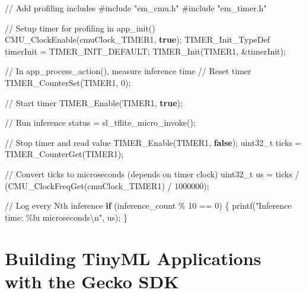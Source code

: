 \documentclass[
  9pt,
  letterpaper,
  abstract,
  titlepage]{scrbook}
\newenvironment{Shaded}{\begin{snugshade}}{\end{snugshade}}
\newcommand{\CommentTok}[1]{\textcolor[rgb]{0.37,0.37,0.37}{#1}}
\newcommand{\ControlFlowTok}[1]{\textcolor[rgb]{0.00,0.23,0.31}{\textbf{#1}}}
\newcommand{\DataTypeTok}[1]{\textcolor[rgb]{0.68,0.00,0.00}{#1}}
\newcommand{\DecValTok}[1]{\textcolor[rgb]{0.68,0.00,0.00}{#1}}
\newcommand{\ImportTok}[1]{\textcolor[rgb]{0.00,0.46,0.62}{#1}}
\newcommand{\KeywordTok}[1]{\textcolor[rgb]{0.00,0.23,0.31}{\textbf{#1}}}
\newcommand{\NormalTok}[1]{\textcolor[rgb]{0.00,0.23,0.31}{#1}}
\newcommand{\OperatorTok}[1]{\textcolor[rgb]{0.37,0.37,0.37}{#1}}
\newcommand{\PreprocessorTok}[1]{\textcolor[rgb]{0.68,0.00,0.00}{#1}}
\newcommand{\SpecialCharTok}[1]{\textcolor[rgb]{0.37,0.37,0.37}{#1}}
\newcommand{\StringTok}[1]{\textcolor[rgb]{0.13,0.47,0.30}{#1}}
\begin{document}
\begin{Shaded}
\begin{Highlighting}[]
\CommentTok{// Add profiling includes}
\PreprocessorTok{\#include }\ImportTok{"em\_cmu.h"}
\PreprocessorTok{\#include }\ImportTok{"em\_timer.h"}

\CommentTok{// Setup timer for profiling in app\_init()}
\NormalTok{CMU\_ClockEnable}\OperatorTok{(}\NormalTok{cmuClock\_TIMER1}\OperatorTok{,} \KeywordTok{true}\OperatorTok{);}
\NormalTok{TIMER\_Init\_TypeDef timerInit }\OperatorTok{=}\NormalTok{ TIMER\_INIT\_DEFAULT}\OperatorTok{;}
\NormalTok{TIMER\_Init}\OperatorTok{(}\NormalTok{TIMER1}\OperatorTok{,} \OperatorTok{\&}\NormalTok{timerInit}\OperatorTok{);}

\CommentTok{// In app\_process\_action(), measure inference time}
\CommentTok{// Reset timer}
\NormalTok{TIMER\_CounterSet}\OperatorTok{(}\NormalTok{TIMER1}\OperatorTok{,} \DecValTok{0}\OperatorTok{);}

\CommentTok{// Start timer}
\NormalTok{TIMER\_Enable}\OperatorTok{(}\NormalTok{TIMER1}\OperatorTok{,} \KeywordTok{true}\OperatorTok{);}

\CommentTok{// Run inference}
\NormalTok{status }\OperatorTok{=}\NormalTok{ sl\_tflite\_micro\_invoke}\OperatorTok{();}

\CommentTok{// Stop timer and read value}
\NormalTok{TIMER\_Enable}\OperatorTok{(}\NormalTok{TIMER1}\OperatorTok{,} \KeywordTok{false}\OperatorTok{);}
\DataTypeTok{uint32\_t}\NormalTok{ ticks }\OperatorTok{=}\NormalTok{ TIMER\_CounterGet}\OperatorTok{(}\NormalTok{TIMER1}\OperatorTok{);}

\CommentTok{// Convert ticks to microseconds (depends on timer clock)}
\DataTypeTok{uint32\_t}\NormalTok{ us }\OperatorTok{=}\NormalTok{ ticks }\OperatorTok{/} \OperatorTok{(}\NormalTok{CMU\_ClockFreqGet}\OperatorTok{(}\NormalTok{cmuClock\_TIMER1}\OperatorTok{)} \OperatorTok{/} \DecValTok{1000000}\OperatorTok{);}

\CommentTok{// Log every Nth inference}
\ControlFlowTok{if} \OperatorTok{(}\NormalTok{inference\_count }\OperatorTok{\%} \DecValTok{10} \OperatorTok{==} \DecValTok{0}\OperatorTok{)} \OperatorTok{\{}
\NormalTok{  printf}\OperatorTok{(}\StringTok{"Inference time: }\SpecialCharTok{\%lu}\StringTok{ microseconds}\SpecialCharTok{\textbackslash{}n}\StringTok{"}\OperatorTok{,}\NormalTok{ us}\OperatorTok{);}
\OperatorTok{\}}
\end{Highlighting}
\end{Shaded}

\section{Building TinyML Applications with the Gecko
SDK}\label{building-tinyml-applications-with-the-gecko-sdk}
\end{document}
